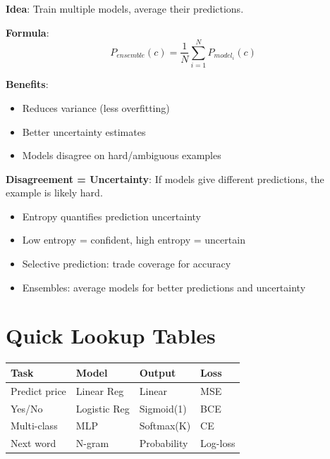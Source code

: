 \documentclass[11pt,a4paper]{article}
\begin{document}
\begin{definitionbox}

\textbf{Idea}: Train multiple models, average their predictions.

\textbf{Formula}:
\[P_{ensemble}(c) = \frac{1}{N}\sum_{i=1}^{N} P_{model_i}(c)\]

\textbf{Benefits}:
\begin{itemize}[leftmargin=*,nosep]
\item Reduces variance (less overfitting)
\item Better uncertainty estimates
\item Models disagree on hard/ambiguous examples
\end{itemize}

\textbf{Disagreement = Uncertainty}: If models give different predictions, the example is likely hard.
\end{definitionbox}

\begin{notebox}

\begin{itemize}[leftmargin=*,nosep]
\item Entropy quantifies prediction uncertainty
\item Low entropy = confident, high entropy = uncertain
\item Selective prediction: trade coverage for accuracy
\item Ensembles: average models for better predictions and uncertainty
\end{itemize}
\end{notebox}

\section{Quick Lookup Tables}

\begin{definitionbox}

\begin{tabular}{@{}l|l|l|l@{}}
\textbf{Task} & \textbf{Model} & \textbf{Output} & \textbf{Loss} \\
\hline
Predict price & Linear Reg & Linear & MSE \\
Yes/No & Logistic Reg & Sigmoid(1) & BCE \\
Multi-class & MLP & Softmax(K) & CE \\
Next word & N-gram & Probability & Log-loss \\
\end{tabular}
\end{definitionbox}
\end{document}
